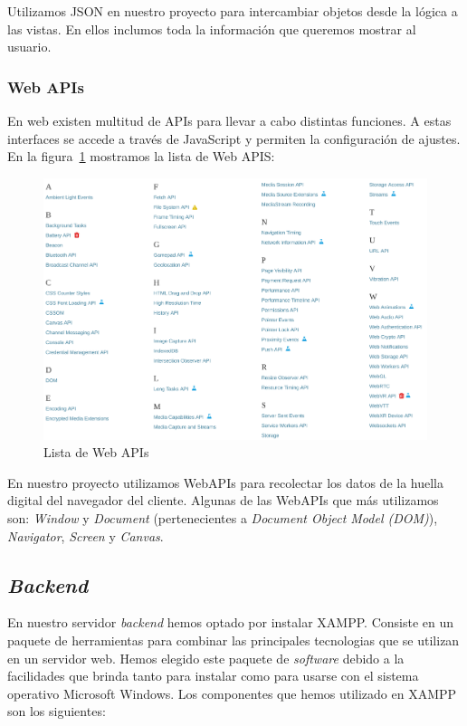 Utilizamos JSON en nuestro proyecto para intercambiar objetos desde la lógica a las vistas. En ellos inclumos toda la información que queremos mostrar al usuario. \par

\subsubsection{Web APIs}
En web existen multitud de APIs para llevar a cabo distintas funciones. A estas interfaces se accede a través de JavaScript y permiten la configuración de ajustes. En la figura~\ref{fig:webAPIs} mostramos la lista de Web APIS: \par 

\begin{figure}[H]
	\centering
	\includegraphics[width=1\textwidth]{Images/webapis.png}
	\caption{Lista de Web APIs}
	\label{fig:webAPIs}
\end{figure}

En nuestro proyecto utilizamos WebAPIs para recolectar los datos de la huella digital del navegador del cliente. Algunas de las WebAPIs que más utilizamos son: \textit{Window} y \textit{Document} (pertenecientes a \textit{Document Object Model (DOM)}), \textit{Navigator}, \textit{Screen} y \textit{Canvas}. \par 


\subsection{\textit{Backend}}

En nuestro servidor \textit{backend} hemos optado por instalar XAMPP. Consiste en un paquete de herramientas para combinar las principales tecnologias que se utilizan en un servidor web. Hemos elegido este paquete de \textit{software} debido a la facilidades que brinda tanto para instalar como para usarse con el sistema operativo Microsoft Windows. Los componentes que hemos utilizado en XAMPP son los siguientes: \par

